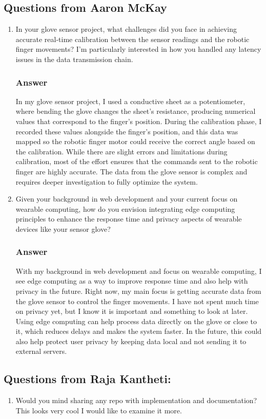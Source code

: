 \subsection{Questions from Aaron McKay}
\begin{enumerate}
  \item In your glove sensor project, what challenges did you face in achieving accurate real-time calibration between the sensor readings and the robotic finger movements? I'm particularly interested in how you handled any latency issues in the data transmission chain.
  \subsubsection*{Answer}
  In my glove sensor project, I used a conductive sheet as a potentiometer, where bending the glove changes the sheet's resistance, producing numerical values that correspond to the finger's position. During the calibration phase, I recorded these values alongside the finger's position, and this data was mapped so the robotic finger motor could receive the correct angle based on the calibration. While there are slight errors and limitations during calibration, most of the effort ensures that the commands sent to the robotic finger are highly accurate. The data from the glove sensor is complex and requires deeper investigation to fully optimize the system.
  \item Given your background in web development and your current focus on wearable computing, how do you envision integrating edge computing principles to enhance the response time and privacy aspects of wearable devices like your sensor glove?
  
  \subsubsection*{Answer}
  With my background in web development and focus on wearable computing, I see edge computing as a way to improve response time and also help with privacy in the future. Right now, my main focus is getting accurate data from the glove sensor to control the finger movements. I have not spent much time on privacy yet, but I know it is important and something to look at later. Using edge computing can help process data directly on the glove or close to it, which reduces delays and makes the system faster. In the future, this could also help protect user privacy by keeping data local and not sending it to external servers.
\end{enumerate}

\subsection{Questions from Raja Kantheti: }
\begin{enumerate}
  \item Would you mind sharing any repo with implementation and documentation? This looks very cool I would like to examine it more.
\end{enumerate}